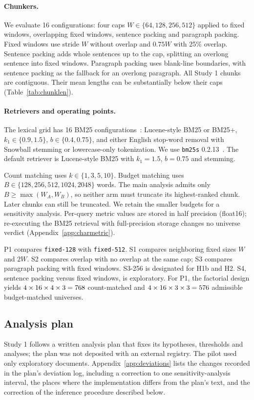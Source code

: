 \documentclass[11pt]{article}
\newcommand{\chunk}[1]{\texttt{#1}}
\begin{document}
\paragraph{Chunkers.}
We evaluate 16 configurations: four caps $W\in\{64,128,256,512\}$ applied to fixed windows, overlapping fixed windows, sentence packing and paragraph packing. Fixed windows use stride $W$ without overlap and $0.75W$ with 25\% overlap. Sentence packing adds whole sentences up to the cap, splitting an overlong sentence into fixed windows. Paragraph packing uses blank-line boundaries, with sentence packing as the fallback for an overlong paragraph. All Study 1 chunks are contiguous. Their mean lengths can be substantially below their caps (Table~\ref{tab:chunklen}).

\paragraph{Retrievers and operating points.}
The lexical grid has 16 BM25 configurations~\cite{robertson2009bm25}: Lucene-style BM25 or BM25+, $k_1\in\{0.9,1.5\}$, $b\in\{0.4,0.75\}$, and either English stop-word removal with Snowball stemming or lowercase-only tokenization. We use \texttt{bm25s} 0.2.13~\cite{lu2024bm25s}. The default retriever is Lucene-style BM25 with $k_1=1.5$, $b=0.75$ and stemming.

Count matching uses $k\in\{1,3,5,10\}$. Budget matching uses $B\in\{128,256,512,1024,2048\}$ words. The main analysis admits only $B\geq\max(W_A,W_B)$, so neither arm must truncate its highest-ranked chunk. Later chunks can still be truncated. We retain the smaller budgets for a sensitivity analysis. Per-query metric values are stored in half precision (float16); re-executing the BM25 retrieval with full-precision storage changes no universe verdict (Appendix~\ref{app:charmetric}).

P1 compares \chunk{fixed-128} with \chunk{fixed-512}. S1 compares neighboring fixed sizes $W$ and $2W$. S2 compares overlap with no overlap at the same cap; S3 compares paragraph packing with fixed windows. S3-256 is designated for H1b and H2. S4, sentence packing versus fixed windows, is exploratory. For P1, the factorial design yields $4\times16\times4\times3=768$ count-matched and $4\times16\times3\times3=576$ admissible budget-matched universes.

\subsection{Analysis plan}
Study 1 follows a written analysis plan that fixes its hypotheses, thresholds and analyses; the plan was not deposited with an external registry. The pilot used only exploratory documents. Appendix~\ref{app:deviations} lists the changes recorded in the plan's deviation log, including a correction to one sensitivity-analysis interval, the places where the implementation differs from the plan's text, and the correction of the inference procedure described below.
\end{document}
